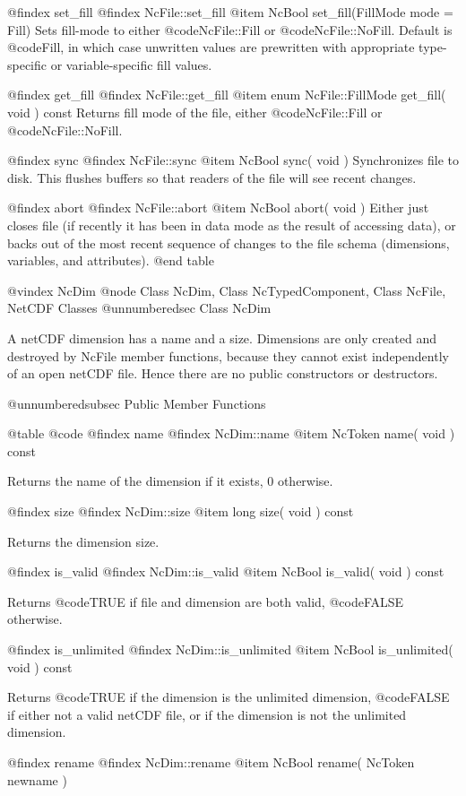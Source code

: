 @findex set_fill
@findex NcFile::set_fill
@item NcBool set_fill(FillMode mode = Fill)
Sets fill-mode to either @code{NcFile::Fill} or @code{NcFile::NoFill}.
Default is @code{Fill}, in which case unwritten values are prewritten
with appropriate type-specific or variable-specific fill values.

@findex get_fill
@findex NcFile::get_fill
@item enum NcFile::FillMode get_fill( void ) const
Returns fill mode of the file, either @code{NcFile::Fill} or
@code{NcFile::NoFill}.

@findex sync
@findex NcFile::sync
@item NcBool sync( void )
Synchronizes file to disk.  This flushes buffers so that readers
of the file will see recent changes.

@findex abort
@findex NcFile::abort
@item NcBool abort( void )
Either just closes file (if recently it has been in data mode as the
result of accessing data), or backs out of the most recent sequence of
changes to the file schema (dimensions, variables, and attributes).
@end table

@vindex NcDim
@node Class NcDim, Class NcTypedComponent, Class NcFile, NetCDF Classes
@unnumberedsec  Class NcDim

A netCDF dimension has a name and a size.  Dimensions are only created and
destroyed by NcFile member functions, because they cannot exist
independently of an open netCDF file.  Hence there are no public
constructors or destructors.

@unnumberedsubsec Public Member Functions

@table @code
@findex name
@findex NcDim::name
@item NcToken name( void ) const

Returns the name of the dimension if it exists, 0 otherwise.

@findex size
@findex NcDim::size
@item long size( void ) const

Returns the dimension size.

@findex is_valid
@findex NcDim::is_valid
@item NcBool is_valid( void ) const

Returns @code{TRUE} if file and dimension are both valid, @code{FALSE}
otherwise.

@findex is_unlimited
@findex NcDim::is_unlimited
@item NcBool is_unlimited( void ) const

Returns @code{TRUE} if the dimension is the unlimited dimension,
@code{FALSE} if either not a valid netCDF file, or if the dimension is
not the unlimited dimension.

@findex rename
@findex NcDim::rename
@item NcBool rename( NcToken newname )

